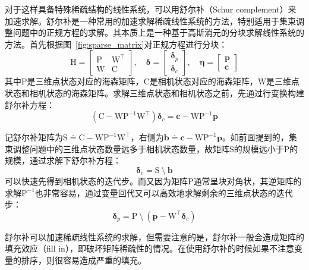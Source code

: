 对于这样具备特殊稀疏结构的线性系统，可以用舒尔补（Schur complement）来加速求解。舒尔补是一种常用的加速求解稀疏线性系统的方法，特别适用于集束调整问题中的正规方程的求解。其本质上是一种基于高斯消元的分块求解线性系统的方法。首先根据图~\ref{fig:sparse_matrix}对正规方程进行分块：
\begin{equation}
    \mathrm{H} =
    \begin{bmatrix}
        \mathrm{P} & \mathrm{W}^\top \\
        \mathrm{W} & \mathrm{C}
    \end{bmatrix}, \quad
    \bm{\delta} = \begin{bmatrix} \bm{\delta}_p \\ \bm{\delta}_c \end{bmatrix}, \quad
    \bm{\eta} = \begin{bmatrix} \bm{p} \\ \bm{c} \end{bmatrix}
\end{equation}
其中$\mathrm{P}$是三维点状态对应的海森矩阵，$\mathrm{C}$是相机状态对应的海森矩阵，$\mathrm{W}$是三维点状态和相机状态的海森矩阵。求解三维点状态和相机状态之前，先通过行变换构建舒尔补方程：
\begin{equation}
    \left( \mathrm{C}-\mathrm{W}\mathrm{P}^{-1}\mathrm{W}^\top \right)
    \bm{\delta}_c = \bm{c}-\mathrm{W}\mathrm{P}^{-1}\bm{p}
    \label{eq:schur_complement}
\end{equation}

记舒尔补矩阵为$\mathrm{S}\doteq\mathrm{C}-\mathrm{W}\mathrm{P}^{-1}\mathrm{W}^\top$，右侧为$\bm{b}\doteq\bm{c}-\mathrm{W}\mathrm{P}^{-1}\bm{p}$。如前面提到的，集束调整问题中的三维点状态数量远多于相机状态数量，故矩阵$\mathrm{S}$的规模远小于$\mathrm{P}$的规模，通过求解下舒尔补方程：
\begin{equation}
    \bm{\delta}_c = \mathrm{S} \:\setminus\: \bm{b}
    \label{eq:solve_schur}
\end{equation}
可以快速先得到相机状态的迭代步。而又因为矩阵$\mathrm{P}$通常呈块对角状，其逆矩阵的求解$\mathrm{P}^{-1}$也非常容易，通过变量回代又可以高效地求解剩余的三维点状态的迭代步：
\begin{equation}
    \bm{\delta}_p = \mathrm{P}
    \:\setminus\:
    \left( \bm{p}-\mathrm{W}^\top\bm{\delta}_c \right)
    \label{eq:back_sub}
\end{equation}

舒尔补可以加速稀疏线性系统的求解，但需要注意的是，舒尔补一般会造成矩阵的填充效应（fill in）\citep{kaess2008isam}，即破坏矩阵稀疏性的情况。在使用舒尔补的时候如果不注意变量的排序，则很容易造成严重的填充。

